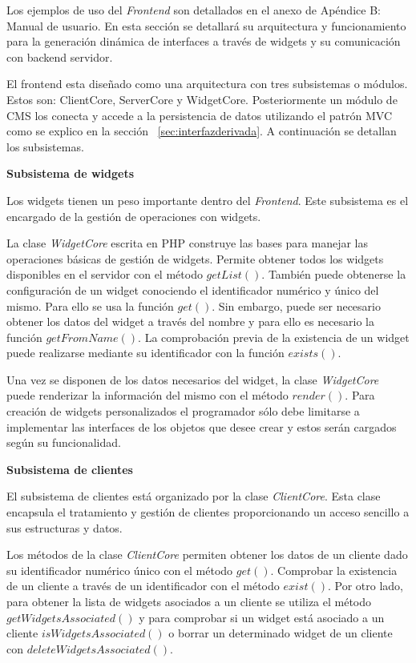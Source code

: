 Los ejemplos de uso del \emph{Frontend} son detallados en el anexo de Apéndice
B: Manual de usuario. En esta sección se detallará su arquitectura y
funcionamiento para la generación dinámica de interfaces a través de widgets y su comunicación con
backend servidor.

El frontend esta diseñado como una arquitectura con tres
subsistemas o módulos. Estos son: ClientCore, ServerCore y WidgetCore.
Posteriormente un módulo de CMS los conecta y accede a la persistencia de datos
utilizando el patrón \acs{MVC}\label{acro:MVC} como se explico en la sección
~\ref{sec:interfazderivada}. A continuación se detallan los subsistemas.

\textbf{Subsistema de widgets}

Los widgets tienen un peso importante dentro del \emph{Frontend}. Este
subsistema es el encargado de la gestión de operaciones con widgets.

La clase \emph{WidgetCore} escrita en PHP construye las bases para manejar las
operaciones básicas de gestión de widgets. Permite obtener todos los widgets
disponibles en el servidor con el método $getList()$. También puede obtenerse la
configuración de un widget conociendo el identificador numérico y único del
mismo. Para ello se usa la función $get()$. Sin embargo, puede ser necesario
obtener los datos del widget a través del nombre y para ello es necesario la
función $getFromName()$. La comprobación previa de la existencia de un widget
puede realizarse mediante su identificador con la función $exists()$.

Una vez se disponen de los datos necesarios del widget, la clase
\emph{WidgetCore} puede renderizar la información del mismo con el método
$render()$. Para creación de widgets personalizados el programador
sólo debe limitarse a implementar las interfaces de los objetos que desee crear 
y estos serán cargados según su funcionalidad.

\textbf{Subsistema de clientes}

El subsistema de clientes está organizado por la clase \emph{ClientCore}. Esta
clase encapsula el tratamiento y gestión de clientes proporcionando un acceso
sencillo a sus estructuras y datos.

Los métodos de la clase \emph{ClientCore} permiten obtener los datos de un
cliente dado su identificador numérico único con el método $get()$. Comprobar la
existencia de un cliente a través de un identificador con el método $exist()$.
Por otro lado, para obtener la lista de widgets asociados a un cliente se
utiliza el método $getWidgetsAssociated()$ y para comprobar si un widget está
asociado a un cliente $isWidgetsAssociated()$ o borrar un determinado widget de
un cliente con $deleteWidgetsAssociated()$.

